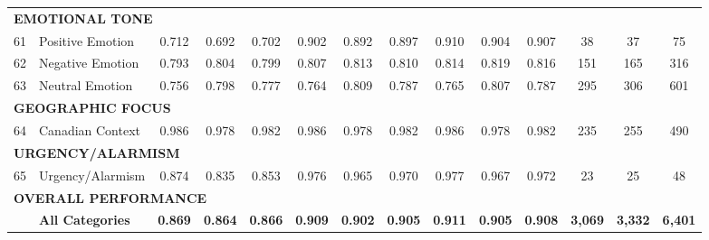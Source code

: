 {\begin{longtable}{p{0.4cm}p{5.5cm}cccccccccccc}
\midrule
\multicolumn{14}{l}{\cellcolor{gray!10}\textbf{EMOTIONAL TONE}} \\
61 & Positive Emotion & 0.712 & 0.692 & 0.702 & 0.902 & 0.892 & 0.897 & 0.910 & 0.904 & 0.907 & 38 & 37 & 75 \\
62 & Negative Emotion & 0.793 & 0.804 & 0.799 & 0.807 & 0.813 & 0.810 & 0.814 & 0.819 & 0.816 & 151 & 165 & 316 \\
63 & Neutral Emotion & 0.756 & 0.798 & 0.777 & 0.764 & 0.809 & 0.787 & 0.765 & 0.807 & 0.787 & 295 & 306 & 601 \\
\midrule
\multicolumn{14}{l}{\cellcolor{gray!10}\textbf{GEOGRAPHIC FOCUS}} \\
64 & Canadian Context & 0.986 & 0.978 & 0.982 & 0.986 & 0.978 & 0.982 & 0.986 & 0.978 & 0.982 & 235 & 255 & 490 \\
\midrule
\multicolumn{14}{l}{\cellcolor{gray!10}\textbf{URGENCY/ALARMISM}} \\
65 & Urgency/Alarmism & 0.874 & 0.835 & 0.853 & 0.976 & 0.965 & 0.970 & 0.977 & 0.967 & 0.972 & 23 & 25 & 48 \\
\midrule
\multicolumn{14}{l}{\cellcolor{gray!20}\textbf{OVERALL PERFORMANCE}} \\
& \textbf{All Categories} & \textbf{0.869} & \textbf{0.864} & \textbf{0.866} & \textbf{0.909} & \textbf{0.902} & \textbf{0.905} & \textbf{0.911} & \textbf{0.905} & \textbf{0.908} & \textbf{3,069} & \textbf{3,332} & \textbf{6,401} \\
\bottomrule
\end{longtable}
} %

